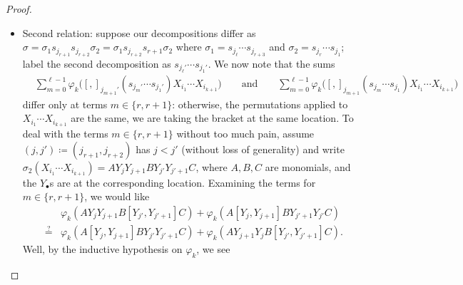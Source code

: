 \documentclass[../notes.tex]{subfiles}
\begin{document}
\begin{proof}
\begin{itemize}
\begin{itemize}
			\item Second relation: suppose our decompositions differ as $\sigma=\sigma_1s_{j_{r+1}}s_{j_{r+2}}\sigma_2=\sigma_1s_{j_{r+2}}s_{r+1}\sigma_2$ where $\sigma_1=s_{j_\ell}\cdots s_{j_{r+3}}$ and $\sigma_2=s_{j_r}\cdots s_{j_1}$; label the second decomposition as $s_{j_\ell'}\cdots s_{j_1'}$. We now note that the sums
			\begin{align*}
				& \sum_{m=0}^{\ell-1}\varphi_k\big([,]_{j_{m+1}'}(s_{j_m'}\cdots s_{j_1'})X_{i_1}\cdots X_{i_{k+1}}\big)\qquad\text{and}\qquad\sum_{m=0}^{\ell-1}\varphi_k\big([,]_{j_{m+1}}(s_{j_m}\cdots s_{j_1})X_{i_1}\cdots X_{i_{k+1}}\big)
			\end{align*}
			differ only at terms $m\in\{r,r+1\}$: otherwise, the permutations applied to $X_{i_1}\cdots X_{i_{k+1}}$ are the same, we are taking the bracket at the same location. To deal with the terms $m\in\{r,r+1\}$ without too much pain, assume $(j,j')\coloneqq(j_{r+1},j_{r+2})$ has $j<j'$ (without loss of generality) and write $\sigma_2(X_{i_1}\cdots X_{i_{k+1}})=AY_{j}Y_{j+1}BY_{j'}Y_{j'+1}C$, where $A,B,C$ are monomials, and the $Y_\bullet$s are at the corresponding location. Examining the terms for $m\in\{r,r+1\}$, we would like
			\begin{align*}
				&\varphi_k(AY_{j}Y_{j+1}B[Y_{j'},Y_{j'+1}]C)+\varphi_k(A[Y_{j},Y_{j+1}]BY_{j'+1}Y_{j'}C) \\
				\stackrel?={}& \varphi_k(A[Y_{j},Y_{j+1}]BY_{j'}Y_{j'+1}C)+\varphi_k(AY_{j+1}Y_{j}B[Y_{j'},Y_{j'+1}]C).
			\end{align*}
			Well, by the inductive hypothesis on $\varphi_k$, we see

\end{itemize}
\end{itemize}
\end{proof}
\end{document}
